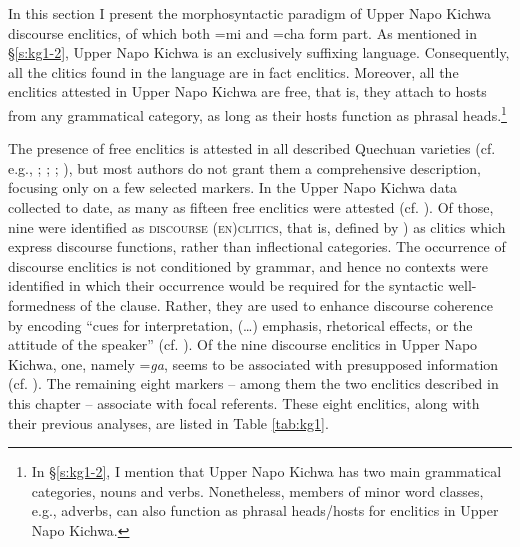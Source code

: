 \documentclass[output=paper]{langscibook}
\begin{document}
In this section I present the morphosyntactic paradigm of Upper Napo Kichwa discourse enclitics, of which both =mi and =cha form part. As mentioned in §‎\ref{s:kg1-2}, Upper Napo Kichwa is an exclusively suffixing language. Consequently, all the clitics found in the language are in fact enclitics. Moreover, all the enclitics attested in Upper Napo Kichwa are free, that is, they attach to hosts from any grammatical category, as long as their hosts function as phrasal heads.\footnote{In §\ref{s:kg1-2}, I mention that Upper Napo Kichwa has two main grammatical categories, nouns and verbs. Nonetheless, members of minor word classes, e.g., adverbs, can also function as phrasal heads/hosts for enclitics in Upper Napo Kichwa.}

The presence of free enclitics is attested in all described Quechuan varieties (cf. e.g., \citealt{Parker1969}; \citealt{Cole1982}; \citealt{Weber1986}; \citealt{Cusihuaman1976}), but most authors do not grant them a comprehensive description, focusing only on a few selected markers. In the Upper Napo Kichwa data collected to date, as many as fifteen free enclitics were attested (cf. \citealt[ch.3]{Grzech2016a}). Of those, nine were identified as \textsc{discourse (en)clitics}, that is, defined by \cite[37]{Spencer2012}) as clitics which express discourse functions, rather than inflectional categories. The occurrence of discourse enclitics is not conditioned by grammar, and hence no contexts were identified in which their occurrence would be required for the syntactic well-formedness of the clause. Rather, they are used to enhance discourse coherence by encoding “cues for interpretation, (…) emphasis, rhetorical effects, or the attitude of the speaker” (cf. \citealt[35]{Spencer2012}). Of the nine discourse enclitics in Upper Napo Kichwa, one, namely =\textit{ga}, seems to be associated with presupposed information (cf. \citealt[ch.4]{Grzech2016a}). The remaining eight markers – among them the two enclitics described in this chapter – associate with focal referents. These eight enclitics, along with their previous analyses, are listed in Table \ref{tab:kg1}. 
\end{document}
